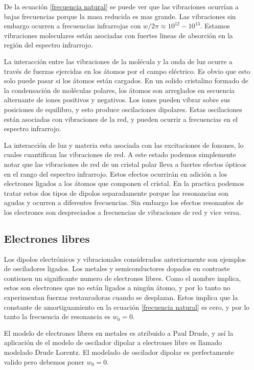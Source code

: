 \documentclass[a4paper,openright,12pt]{book}
\begin{document}
De la ecuación \ref{frecuencia natural} se puede ver que las vibraciones ocurrían a bajas frecuencias porque la masa reducida es mas grande. Las vibraciones sin embargo ocurren a frecuencias infrarrojas con $w/2\pi\approx 10^{12}-10^{13}$. Estamos vibraciones moleculares están asociadas con fuertes lineas de absorción en la región del espectro infrarrojo.

La interacción entre las vibraciones de la molécula y la onda de luz ocurre a través de fuerzas ejercidas en los átomos por el campo eléctrico. Es obvio que esto solo puede pasar si los átomos están cargados. 
En un solido cristalino formado de la condensación de moléculas polares, los átomos son arreglados en secuencia alternante de iones positivos y negativos. Los iones pueden vibrar sobre sus posiciones de equilibro, y esto produce oscilaciones dipolares. Estas oscilaciones están asociadas con vibraciones de la red, y pueden ocurrir a frecuencias en el espectro infrarrojo. 

La interacción de luz y materia esta asociada con las excitaciones de fonones, lo cuales cuantifican las vibraciones de red. A este estado podemos simplemente notar que las vibraciones de red de un cristal polar lleva a fuertes efectos ópticos en el rango del espectro infrarrojo. Estos efectos ocurrirán en adición a los electrones ligados a los átomos que componen el cristal. En la practica podemos tratar estos dos tipos de dipolos separadamente porque las resonancias son agudas y ocurren a diferentes frecuencias. Sin embargo los efectos resonantes de los electrones son despreciados a frecuencias de vibraciones de red y vice versa. 

\subsection{Electrones libres}
Los dipolos electrónicos y vibracionales considerados anteriormente son ejemplos de osciladores ligados. Los metales y semiconductores dopados en contraste contienen un significante numero de electrones libres. Como el nombre implica, estos son electrones que no están ligados a ningún átomo, y por lo tanto no experimentan fuerzas restauradoras cuando se desplazan. Estos implica que la constante de amortiguamiento en la ecuación \ref{frecuencia natural} es cero, y por lo tanto la frecuencia de resonancia es $w_{0}=0$.

El modelo de electrones libres en metales es atribuido a Paul Drude, y así la aplicación de el modelo de oscilador dipolar  a electrones libre es llamado modelado Drude Lorentz. El modelado de oscilador dipolar es perfectamente valido pero debemos poner $w_{0}=0$.
\end{document}
